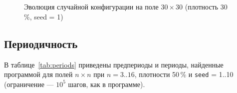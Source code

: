 \documentclass[a4paper,14pt]{extarticle}
\newcommand{\consolesmall}{\fontsize{7}{7.35}\selectfont\ttfamily}
\newcommand{\consoletiny}{\fontsize{5.2}{5.46}\selectfont\ttfamily}
\newcommand{\console}[2][\consolesmall]{}
\begin{document}
\begin{figure}[H]
	\centering
	\begin{minipage}{0.48\textwidth}\centering\console[\consoletiny]{random_0}\end{minipage}\hfill
	\begin{minipage}{0.48\textwidth}\centering\console[\consoletiny]{random_1}\end{minipage}\\[2mm]
	\begin{minipage}{0.48\textwidth}\centering\console[\consoletiny]{random_10}\end{minipage}\hfill
	\begin{minipage}{0.48\textwidth}\centering\console[\consoletiny]{random_100}\end{minipage}\\[2mm]
	\begin{minipage}{0.48\textwidth}\centering\console[\consoletiny]{random_1000}\end{minipage}
	\caption{Эволюция случайной конфигурации на поле $30 \times 30$ (плотность 30\,\%, seed = 1)}
	\label{fig:random}
\end{figure}

\subsection{Периодичность}

В таблице~\ref{tab:periods} приведены предпериоды и периоды, найденные программой для полей $n \times n$ при $n = 3..16$, плотности 50\,\% и \texttt{seed} = 1..10 (ограничение --- $10^5$ шагов, как в программе).
\end{document}
